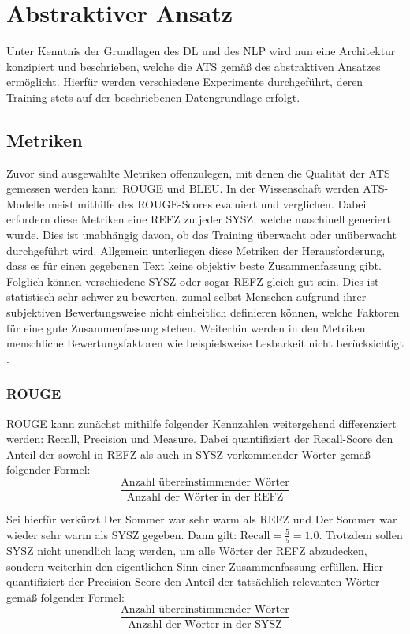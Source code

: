\chapter{Abstraktiver Ansatz}
\thispagestyle{fancy}
\label{chap:Abstraktiver Ansatz}

\noindent
Unter Kenntnis der Grundlagen des \ac{DL} und des \ac{NLP} wird nun eine Architektur konzipiert und beschrieben, welche die \ac{ATS} gemäß des abstraktiven Ansatzes ermöglicht. Hierfür werden verschiedene Experimente durchgeführt, deren Training stets auf der beschriebenen Datengrundlage erfolgt.\\


\section{Metriken}
\noindent
Zuvor sind ausgewählte Metriken offenzulegen, mit denen die Qualität der \ac{ATS} gemessen werden kann: \ac{ROUGE} und \ac{BLEU}. In der Wissenschaft werden \ac{ATS}-Modelle meist mithilfe des \ac{ROUGE}-Scores evaluiert und verglichen. Dabei erfordern diese Metriken eine \ac{REFZ} zu jeder \ac{SYSZ}, welche maschinell generiert wurde. Dies ist unabhängig davon, ob das Training überwacht oder unüberwacht durchgeführt wird. Allgemein unterliegen diese Metriken der Herausforderung, dass es für einen gegebenen Text keine objektiv beste Zusammenfassung gibt. Folglich können verschiedene \ac{SYSZ} oder sogar \ac{REFZ} gleich gut sein. Dies ist statistisch sehr schwer zu bewerten, zumal selbst Menschen aufgrund ihrer subjektiven Bewertungsweise nicht einheitlich definieren können, welche Faktoren für eine gute Zusammenfassung stehen. Weiterhin werden in den Metriken menschliche Bewertungsfaktoren wie beispielsweise Lesbarkeit nicht berücksichtigt \cite{LEM20}.\\


\subsection{ROUGE}
\noindent
\ac{ROUGE} kann zunächst mithilfe folgender Kennzahlen weitergehend differenziert werden: Recall, Precision und Measure. Dabei quantifiziert der Recall-Score den Anteil der sowohl in \ac{REFZ} als auch in \ac{SYSZ} vorkommender Wörter gemäß folgender Formel:\\
$$\frac{\text{Anzahl übereinstimmender Wörter}}{\text{Anzahl der Wörter in der REFZ}}$$
\newpage

\noindent
Sei hierfür verkürzt \glqq Der Sommer war sehr warm\grqq{} als \ac{REFZ} und \glqq Der Sommer war wieder sehr warm\grqq{} als \ac{SYSZ} gegeben. Dann gilt: $\text{Recall} = \frac{5}{5} = 1.0$. Trotzdem sollen \ac{SYSZ} nicht unendlich lang werden, um alle Wörter der \ac{REFZ} abzudecken, sondern weiterhin den eigentlichen Sinn einer Zusammenfassung erfüllen. Hier quantifiziert der Precision-Score den Anteil der tatsächlich relevanten Wörter gemäß folgender Formel:\\
$$\frac{\text{Anzahl übereinstimmender Wörter}}{\text{Anzahl der Wörter in der SYSZ}}$$ \newline

